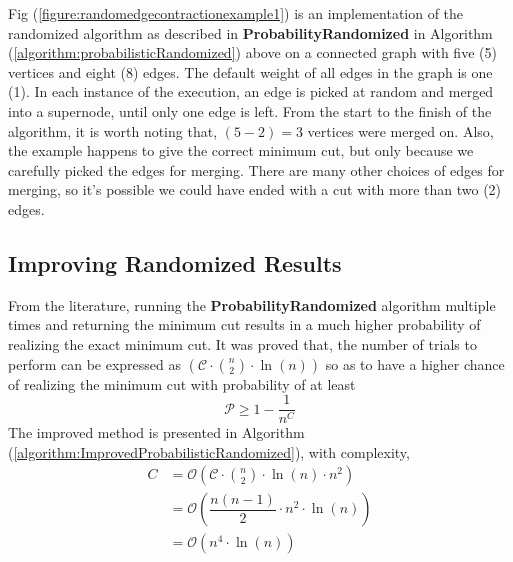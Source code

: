 \documentclass[longpaper, english, final, times]{revdetua}
\begin{document}
			
			Fig (\ref{figure:randomedgecontractionexample1}) is an implementation of the randomized algorithm as described in \textbf{ProbabilityRandomized} in Algorithm (\ref{algorithm:probabilisticRandomized}) above on a connected graph with five (5) vertices and eight (8) edges. The default weight of all edges in the graph is one (1). In each instance of the execution, an edge is picked at random and merged into a supernode, until only one edge is left. From the start to the finish of the algorithm, it is worth noting that, $(5-2)=3$ vertices were merged on. Also, the example happens to give the correct minimum cut, but only because we carefully picked the edges for merging. There are many other choices of edges for merging, so it's possible we could have ended with a cut with more than two (2) edges.\\
		
		\subsection{Improving Randomized Results}
			From the literature, running the \textbf{ProbabilityRandomized} algorithm multiple times and returning the minimum cut results in a much higher probability of realizing the exact minimum cut. It was proved that, the number of trials to perform can be expressed as $\left(\mathcal{C}\cdot {n\choose 2}\cdot \ln (n)\right)$ so as to have a higher chance of realizing the minimum cut with probability of at least $$\mathcal{P}\ge 1-\dfrac{1}{n^C}$$
			The improved method is presented in Algorithm (\ref{algorithm:ImprovedProbabilisticRandomized}), with complexity, 
			\begin{align*}
				C &=\mathcal{O}\left(\mathcal{C}\cdot {n\choose 2}\cdot \ln (n) \cdot n^2 \right)\\
				&= \mathcal{O}\left(\dfrac{n(n-1)}{2}\cdot n^2\cdot \ln(n)\right)\\
				&=\mathcal{O}\left(n^4\cdot \ln(n)\right)
			\end{align*}
			
\end{document}
